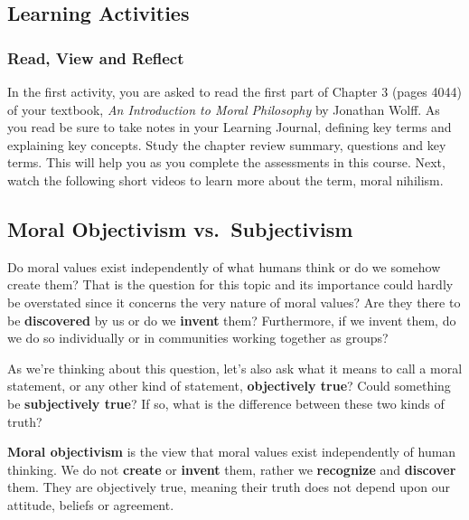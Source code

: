 \documentclass[
]{book}
\begin{document}
\hypertarget{learning-activities-3}{%
\subsection*{Learning Activities}\label{learning-activities-3}}

\begin{reflect}
\hypertarget{read-view-and-reflect-3}{%
\subsubsection*{Read, View and Reflect}\label{read-view-and-reflect-3}}

In the first activity, you are asked to read the first part of Chapter 3 (pages
4044) of your textbook, \emph{An Introduction to Moral Philosophy} by Jonathan
Wolff. As you read be sure to take notes in your Learning Journal, defining key
terms and explaining key concepts. Study the chapter review summary, questions
and key terms. This will help you as you complete the assessments in this
course.
Next, watch the following short videos to learn more about the term, moral
nihilism.
\end{reflect}

\hypertarget{moral-objectivism-vs.-subjectivism}{%
\subsection*{Moral Objectivism vs.~Subjectivism}\label{moral-objectivism-vs.-subjectivism}}

Do moral values exist independently of what humans think or do we somehow create them? That is the question for this topic and its importance could hardly be overstated since it concerns the very nature of moral values? Are they there to be \textbf{discovered} by us or do we \textbf{invent} them? Furthermore, if we invent them, do we do so individually or in communities working together as groups?

As we're thinking about this question, let's also ask what it means to call a
moral statement, or any other kind of statement, \textbf{objectively true}? Could
something be \textbf{subjectively true}? If so, what is the difference between these
two kinds of truth?

\textbf{Moral objectivism} is the view that moral values exist independently of human thinking. We do not \textbf{create} or \textbf{invent} them, rather we \textbf{recognize} and \textbf{discover} them. They are objectively true, meaning their truth does not depend upon our attitude, beliefs or agreement.
\end{document}
